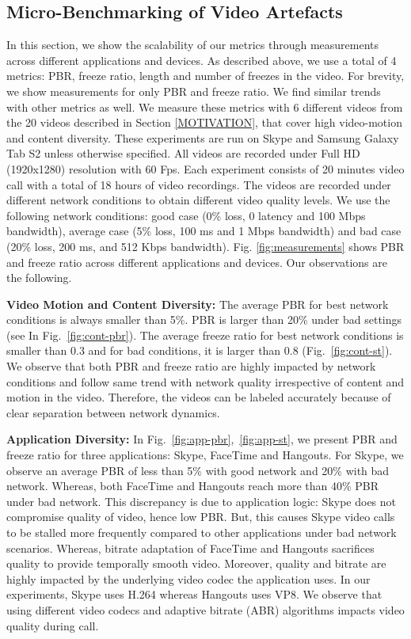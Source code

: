 \subsection{Micro-Benchmarking of Video Artefacts}
In this section, we show the scalability of our metrics through measurements across different applications and devices. As described above, we use a total of 4 metrics: PBR, freeze ratio, length and number of freezes in the video. For brevity, we show measurements for only PBR and freeze ratio. We find similar trends with other metrics as well. We measure these metrics with 6 different videos from the 20 videos described in Section \ref{MOTIVATION}, that cover high video-motion and content diversity. These experiments are run on Skype and Samsung Galaxy Tab S2 unless otherwise specified. All videos are recorded under Full HD (1920x1280) resolution with 60 Fps. Each experiment consists of 20 minutes video call with a total of 18 hours of video recordings. The videos are recorded under different network conditions to obtain different video quality  levels. We use the following network conditions: good case (0\% loss, 0 latency and 100 Mbps bandwidth), average case (5\% loss, 100 ms and 1 Mbps bandwidth) and bad case (20\% loss, 200 ms, and 512 Kbps bandwidth). Fig. \ref{fig:measurements} shows PBR and freeze ratio across different applications and devices. Our observations are the following.



\noindent \textbf{Video Motion and Content Diversity:} 
The average PBR for best network conditions is always smaller than 5\%. PBR is larger than 20\% under bad settings (see In Fig.~\ref{fig:cont-pbr}). 
The average freeze ratio for best network conditions is smaller than 0.3 and for bad conditions, it is larger than 0.8 (Fig.~\ref{fig:cont-st}). 
We observe that both PBR and freeze ratio are highly impacted by network conditions and follow same trend with network quality irrespective of content and motion in the video.
Therefore, the videos can be labeled accurately because of clear separation between network dynamics.

\noindent \textbf{Application Diversity:} 
In Fig.~\ref{fig:app-pbr},~\ref{fig:app-st}, we present PBR and freeze ratio for three applications: Skype, FaceTime and Hangouts.
For Skype, we observe an average PBR of less than 5\% with good network and 20\% with bad network. 
Whereas, both FaceTime and Hangouts reach more than 40\% PBR under bad network. 
This discrepancy is due to application logic: Skype does not compromise quality of video, hence low PBR. But, this causes Skype video calls to be stalled more frequently compared to other applications under bad network scenarios. Whereas,  bitrate adaptation of FaceTime and Hangouts sacrifices quality to provide temporally smooth video. 
Moreover, quality and bitrate are highly impacted by the underlying video codec the application uses. In our experiments, Skype uses H.264 whereas Hangouts uses VP8. We observe that using different video codecs and adaptive bitrate (ABR) algorithms impacts video quality during call.

